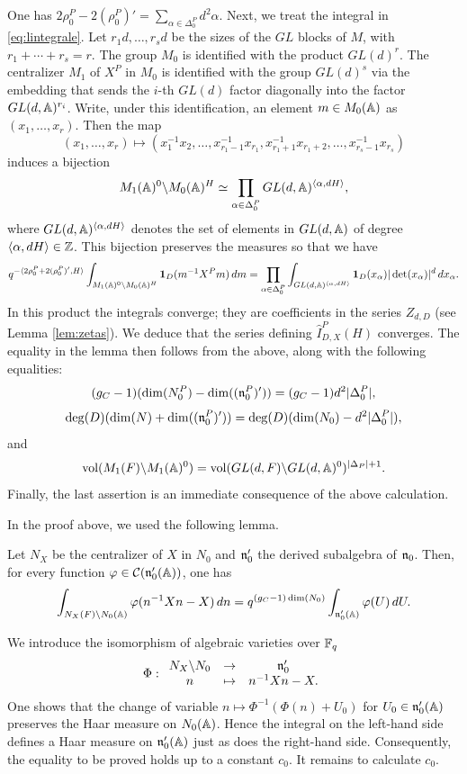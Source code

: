 \begin{paragr}
\begin{preuve}
One has $2\rho_0^P-2(\rho_0^P)'=\sum_{\alpha\in \Delta_0^P}d^2\alpha$. Next, we treat the integral in \eqref{eq:lintegrale}. Let $r_1d,\ldots ,r_sd$ be the sizes of the $GL$ blocks of $M$, with $r_1+\cdots +r_s=r$. The group $M_0$ is identified with the product $GL(d)^r$. The centralizer $M_1$ of $X^P$ in $M_0$ is identified with the group $GL(d)^s$ via the embedding that sends the $i$-th $GL(d)$ factor diagonally into the factor $GL(d,\mathbb{A})^{r_i}$. Write, under this identification, an element $m\in M_0(\mathbb{A})$ as $(x_1,\ldots,x_r)$. Then the map
$$(x_1,\ldots,x_r)\mapsto (x^{-1}_1x_2,\ldots, x_{r_1-1}^{-1}x_{r_1},x_{r_1+1}^{-1}x_{r_1+2},\ldots,x_{r_s-1}^{-1}x_{r_s})$$
induces a bijection
$$M_1(\mathbb{A})^0\backslash M_0(\mathbb{A})^{H} \simeq \prod_{\alpha\in \Delta_0^P} GL(d,\mathbb{A})^{\langle \alpha,dH\rangle},$$
where $GL(d,\mathbb{A})^{\langle \alpha,dH\rangle}$ denotes the set of elements in $GL(d,\mathbb{A})$ of degree $\langle \alpha,dH\rangle\in \mathbb{Z}$. This bijection preserves the measures so that we have 
$$ q^{-\langle 2\rho_0^P+2(\rho_0^P)',H\rangle} \int_{M_1(\mathbb{A})^0\backslash M_0(\mathbb{A})^{H}} \mathbf{1}_{D}(m^{-1}X^P m)\, dm = \prod_{\alpha\in \Delta_0^P}\int_{ GL(d,\mathbb{A})^{\langle \alpha,dH\rangle}}\mathbf{1}_D(x_\alpha)|\det(x_\alpha)|^d\, dx_\alpha.$$
In this product the integrals converge; they are coefficients in the series $Z_{d,D}$ (see Lemma \ref{lem:zetas}). We deduce that the series defining $\hat{I}^P_{D,X}(H)$ converges.
The equality in the lemma then follows from the above, along with the following equalities:
$$(g_C-1)(\dim(N_0^P)-\dim((\mathfrak{n}_0^P)'))= (g_C-1)d^2 |\Delta_0^P|,$$
$$\deg(D)(\dim(N)+\dim((\mathfrak{n}_0^P)'))= \deg(D)(\dim(N_0)-d^2 |\Delta_0^P|),$$
and
$$\operatorname{vol}(M_1(F)\backslash M_1(\mathbb{A})^0)=\operatorname{vol}(GL(d,F)\backslash GL(d,\mathbb{A})^0)^{|\Delta_P|+1}.$$
Finally, the last assertion is an immediate consequence of the above calculation.
\end{preuve}

In the proof above, we used the following lemma.

\begin{lemme}\label{lem:mesure}
Let $N_X$ be the centralizer of $X$ in $N_0$ and $\mathfrak{n}_0'$ the derived subalgebra of $\mathfrak{n}_0$. Then, for every function $\varphi\in \mathcal{C}(\mathfrak{n}_0'(\mathbb{A}))$, one has
$$\int_{N_X(F)\backslash N_0(\mathbb{A})} \varphi(n^{-1}Xn-X)\, dn=q^{ (g_C-1)\dim(N_0)}  \int_{\mathfrak{n}_0'(\mathbb{A})}\varphi(U)\,dU.$$
\end{lemme}

\begin{preuve}
We introduce the isomorphism of algebraic varieties over $\mathbb{F}_q$
$$\Phi:
\begin{array}{ccc}
  N_X\backslash N_0 &\to& \mathfrak{n}'_0 \\ n &\mapsto & n^{-1}Xn-X.
\end{array}$$
One shows that the change of variable $n\mapsto \Phi^{-1}(\Phi(n)+U_0)$ for $U_0\in \mathfrak{n}_0'(\mathbb{A})$ preserves the Haar measure on $N_0(\mathbb{A})$. Hence the integral on the left-hand side defines a Haar measure on $\mathfrak{n}_0'(\mathbb{A})$ just as does the right-hand side. Consequently, the equality to be proved holds up to a constant $c_0$. It remains to calculate $c_0$. 


\end{preuve}
\end{paragr}

